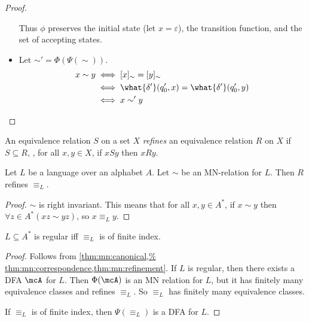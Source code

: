 \begin{proof}
\begin{itemize}
        Thus $\phi$ preserves the initial state (let $x = \varepsilon$), the
        transition function, and the set of accepting states.
        \item Let ${\sim'} = \Phi(\Psi({\sim}))$.
        \begin{align*}
            x \sim y &\iff [x]_{\sim} = [y]_{\sim} \\
            &\iff \what{\delta'}(q'_0, x) = \what{\delta'}(q'_0, y) \\
            &\iff x \sim' y \qedhere
        \end{align*}
    \end{itemize}
\end{proof}

\begin{definition} \label{def:eq:refinement}
    An equivalence relation $S$ on a set $X$ \emph{refines} an equivalence
    relation $R$ on $X$ if $S \subseteq R$, \ie, for all $x, y \in X$,
    if $xSy$ then $xRy$.
\end{definition}

\begin{lemma} \label{thm:mn:refinement}
    Let $L$ be a language over an alphabet $A$.
    Let $\sim$ be an MN-relation for $L$.
    Then $R$ refines $\equiv_L$.
\end{lemma}
\begin{proof}
    $\sim$ is right invariant.
    This means that for all $x, y \in A^*$, if $x \sim y$ then
    $\forall z \in A^* (xz \sim yz)$, so $x \equiv_L y$.
\end{proof}

\begin{theorem*} \label{thm:mn:mn}
    $L \subseteq A^*$ is regular iff $\equiv_L$ is of finite index.
\end{theorem*}
\begin{proof}
    Follows from \cref{thm:mn:canonical,%
    thm:mn:correspondence,thm:mn:refinement}.
    If $L$ is regular, then there exists a DFA $\mcA$ for $L$.
    Then $\Phi(\mcA)$ is an MN relation for $L$, but it has finitely many
    equivalence classes and refines $\equiv_L$.
    So $\equiv_L$ has finitely many equivalence classes.

    If $\equiv_L$ is of finite index, then $\Psi(\equiv_L)$ is a DFA for
    $L$.
\end{proof}
